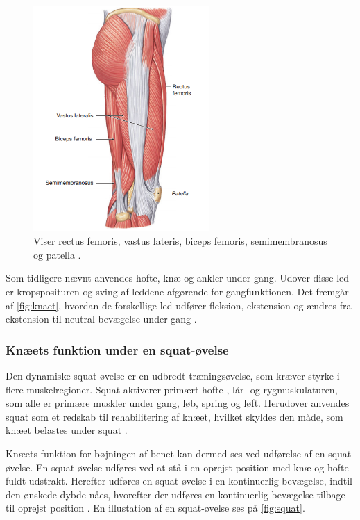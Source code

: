 \begin{figure} [H]
\centering
\includegraphics[width=0.6\textwidth]{figures/laarmuskler}
\caption{Viser rectus femoris, vastus lateris, biceps femoris, semimembranosus og patella  \citep{martini2012}.}
\label{fig:knaet}
\end{figure} 

\noindent
Som tidligere nævnt anvendes hofte, knæ og ankler under gang. Udover disse led er kropsposituren og sving af leddene afgørende for gangfunktionen. Det fremgår af \autoref{fig:knaet}, hvordan de forskellige led udfører fleksion, ekstension og ændres fra ekstension til neutral bevægelse under gang \citep{martini2012}.

\subsubsection{Knæets funktion under en squat-øvelse} \label{sec:knaeled_squat}
Den dynamiske squat-øvelse er en udbredt træningsøvelse, som kræver styrke i flere muskelregioner. Squat aktiverer primært hofte-, lår- og rygmuskulaturen, som alle er primære muskler under gang, løb, spring og løft. Herudover anvendes squat som et redskab til rehabilitering af knæet, hvilket skyldes den måde, som knæet belastes under squat \citep{escamilla2001}. 

Knæets funktion for bøjningen af benet kan dermed ses ved udførelse af en squat-øvelse. En squat-øvelse udføres ved at stå i en oprejst position med knæ og hofte fuldt udstrakt. Herefter udføres en squat-øvelse i en kontinuerlig bevægelse, indtil den ønskede dybde nåes, hvorefter der udføres en kontinuerlig bevægelse tilbage til oprejst position \citep{escamilla2001}. En illustation af en squat-øvelse ses på \autoref{fig:squat}.

